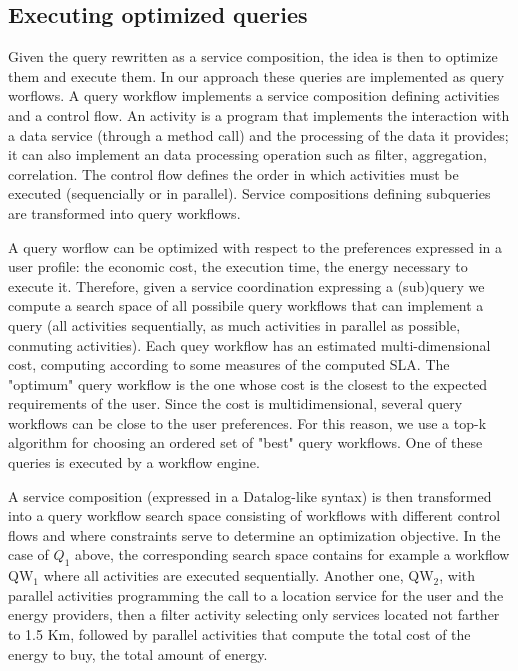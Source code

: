\subsection{Executing optimized queries}
\label{sec:queryOpt}
Given the query rewritten as a service composition, the idea is then to optimize them and execute them. In our approach these queries are implemented as query worflows. A query workflow implements a service composition defining activities and a control flow. An activity is a program that implements the interaction with a data service (through a method call) and the processing of the data it provides; it can also implement an data processing operation such as filter, aggregation, correlation. The control flow defines the order in which activities must be executed (sequencially or in parallel). Service compositions defining subqueries are transformed into query workflows.

A query worflow can be optimized with respect to the preferences expressed in a user profile: the economic cost, the execution time, the energy necessary to execute it. Therefore, given a service coordination expressing a (sub)query we compute a search space of all possibile query workflows that can implement a query (all activities sequentially, as much activities in parallel as possible, conmuting activities). Each quey workflow has an estimated multi-dimensional cost, computing according to some measures of the computed SLA. The "optimum" query workflow is the one whose cost is the closest to the expected requirements of the user. Since the cost is multidimensional, several query workflows can be close to the user preferences. For this reason, we use a top-k algorithm for choosing an ordered set of "best" query workflows. One of these queries is executed by a workflow engine.


A service composition (expressed in a Datalog-like syntax) is then transformed into a query workflow search space consisting of workflows with different control flows and where constraints serve to determine an optimization objective. 
In the case of $Q_1$ above, the corresponding search space contains for example a workflow {\sf QW$_1$} where all activities are executed sequentially. 
Another one, {\sf QW$_2$}, with parallel activities programming the call to a location service for the user and the energy providers, then a filter activity selecting only services located not farther to 1.5 Km, followed by  parallel activities that compute the total cost of the energy to buy, the total amount of energy. 
    
